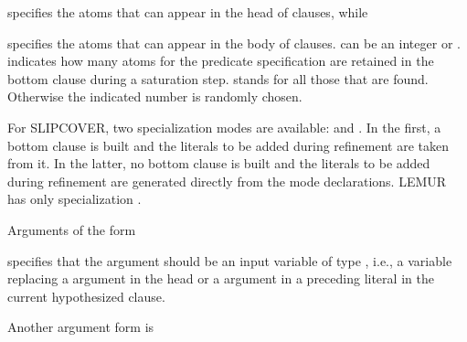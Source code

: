 \documentclass[letterpaper,10pt,english]{sphinxmanual}
\begin{document}
specifies the atoms that can appear in the head of clauses, while

\begin{sphinxVerbatim}[commandchars=\\\{\}]
\end{sphinxVerbatim}

specifies the atoms that can appear in the body of clauses.  can be an integer or \sphinxcode{\sphinxupquote{*}}.  indicates how many atoms for the predicate specification are retained in the bottom clause during a saturation step. \sphinxcode{\sphinxupquote{*}} stands for all those that are found.
Otherwise the indicated number is randomly chosen.

For SLIPCOVER, two specialization modes are available:  and . In the first, a bottom clause is built and the literals to be added during refinement are taken from it. In the latter, no bottom clause is built and the literals to be added during refinement are generated directly from the mode declarations. LEMUR has only specialization .

Arguments of the form

\begin{sphinxVerbatim}[commandchars=\\\{\}]
\end{sphinxVerbatim}

specifies that the argument should be an input variable of type , i.e., a variable replacing a  argument in the head or a  argument in a preceding literal in the current hypothesized clause.

Another argument form is

\begin{sphinxVerbatim}[commandchars=\\\{\}]
\end{sphinxVerbatim}
\end{document}

